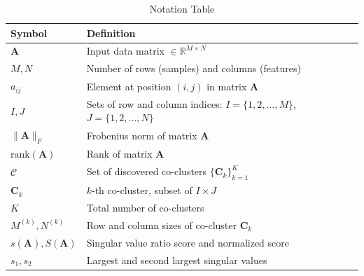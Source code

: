 \documentclass[journal]{IEEEtran}
\begin{document}
    {\color{blue}
        \begin{table}[htbp]
            \centering
            \caption{Notation Table}
            \label{tab:notation}
            \begin{tabular}{@{} p{} p{} @{}}
                \toprule
                \textbf{Symbol}                    & \textbf{Definition}                                                             \\
                \midrule
                $\mathbf{A}$                       & Input data matrix $\in \mathbb{R}^{M \times N}$                                 \\
                $M, N$                             & Number of rows (samples) and columns (features)                                 \\
                $a_{ij}$                           & Element at position $(i,j)$ in matrix $\mathbf{A}$                              \\
                $I, J$                             & Sets of row and column indices: $I = \{1,2,\ldots,M\}$, $J = \{1,2,\ldots,N\}$  \\
                $\|\mathbf{A}\|_F$                 & Frobenius norm of matrix $\mathbf{A}$                                           \\
                $\text{rank}(\mathbf{A})$          & Rank of matrix $\mathbf{A}$                                                     \\
                $\mathcal{C}$                      & Set of discovered co-clusters $\{\mathbf{C}_k\}_{k=1}^K$                        \\
                $\mathbf{C}_k$                     & $k$-th co-cluster, subset of $I \times J$                                       \\
                $K$                                & Total number of co-clusters                                                     \\
                $M^{(k)}, N^{(k)}$                 & Row and column sizes of co-cluster $\mathbf{C}_k$                               \\
                $s(\mathbf{A}), S(\mathbf{A})$     & Singular value ratio score and normalized score                                 \\
                $s_1, s_2$                         & Largest and second largest singular values                                      \\

\end{tabular}
\end{table}}
\end{document}

